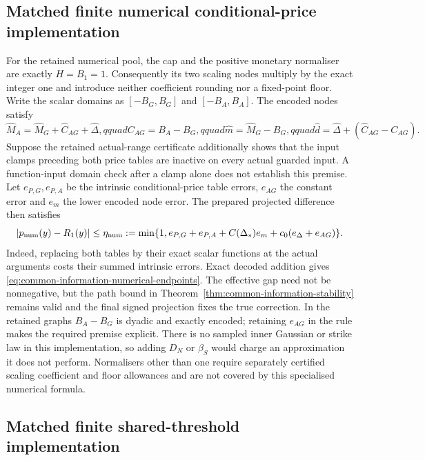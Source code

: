 \subsection{Matched finite numerical conditional-price implementation}

For the retained numerical pool, the cap and the positive monetary
normaliser are exactly $H=B_1=1$. Consequently its two scaling nodes
multiply by the exact integer one and introduce neither coefficient
rounding nor a fixed-point floor. Write the scalar domains as
$[-B_G,B_G]$ and $[-B_A,B_A]$. The encoded nodes satisfy
\begin{equation}
 \widehat M_A=\widehat M_G+\widehat C_{AG}+\widehat\Delta,qquad
 C_{AG}=B_A-B_G,qquad
 \widehat m=\widehat M_G-B_G,qquad
 \widehat d=\widehat\Delta+(\widehat C_{AG}-C_{AG}).
 \label{eq:common-information-numerical-endpoints}
\end{equation}
Suppose the retained actual-range certificate additionally shows that
the input clamps preceding both price tables are inactive on every
actual guarded input. A function-input domain check after a clamp alone
does not establish this premise. Let $e_{P,G},e_{P,A}$ be the intrinsic
conditional-price table errors, $e_{AG}$ the constant error and $e_m$
the lower encoded node error. The prepared projected difference then
satisfies
\begin{equation}
 |p_{\rm num}(y)-R_1(y)|\leq\eta_{\rm num}:=
 \min\{1,e_{P,G}+e_{P,A}+C(\Delta_*)e_m
                             +c_0(e_\Delta+e_{AG})\}.
 \label{eq:common-information-numerical-bound}
\end{equation}
Indeed, replacing both tables by their exact scalar functions at the
actual arguments costs their summed intrinsic errors. Exact decoded
addition gives \eqref{eq:common-information-numerical-endpoints}.
The effective gap need not be nonnegative, but the path bound in
Theorem~\ref{thm:common-information-stability} remains valid and the
final signed projection fixes the true correction. In the retained
graphs $B_A-B_G$ is dyadic and exactly encoded; retaining $e_{AG}$ in
the rule makes the required premise explicit. There is no sampled
inner Gaussian or strike law in this implementation, so adding $D_N$
or $\beta_S$ would charge an approximation it does not perform.
Normalisers other than one require separately certified scaling
coefficient and floor allowances and are not covered by this specialised
numerical formula.

\subsection{Matched finite shared-threshold implementation}

